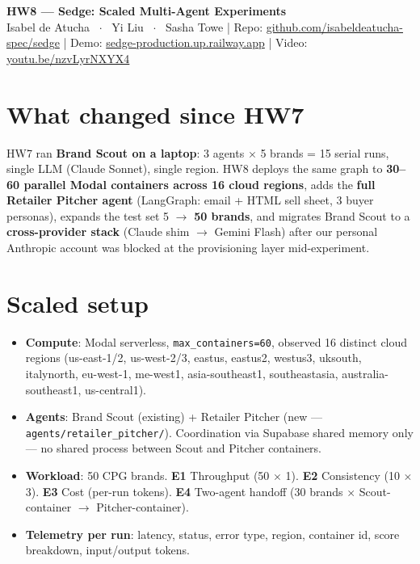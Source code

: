 \documentclass[9pt]{extarticle}
\begin{document}
\begin{center}
{\Large\bfseries HW8 — Sedge: Scaled Multi-Agent Experiments}\\[2pt]
{\small Isabel de Atucha \, $\cdot$ \, Yi Liu \, $\cdot$ \, Sasha Towe \quad|\quad
Repo: \href{https://github.com/isabeldeatucha-spec/sedge}{github.com/isabeldeatucha-spec/sedge} \quad|\quad
Demo: \href{https://sedge-production.up.railway.app}{sedge-production.up.railway.app} \quad|\quad
Video: \href{https://youtu.be/nzvLyrNXYX4}{youtu.be/nzvLyrNXYX4}}
\end{center}

\section*{What changed since HW7}
HW7 ran \textbf{Brand Scout on a laptop}: 3 agents $\times$ 5 brands = 15 serial runs, single LLM (Claude Sonnet), single region. HW8 deploys the same graph to \textbf{30--60 parallel Modal containers across 16 cloud regions}, adds the \textbf{full Retailer Pitcher agent} (LangGraph: email + HTML sell sheet, 3 buyer personas), expands the test set 5 $\rightarrow$ \textbf{50 brands}, and migrates Brand Scout to a \textbf{cross-provider stack} (Claude shim $\rightarrow$ Gemini Flash) after our personal Anthropic account was blocked at the provisioning layer mid-experiment.

\section*{Scaled setup}
\begin{itemize}
  \item \textbf{Compute}: Modal serverless, \texttt{max\_containers=60}, observed 16 distinct cloud regions (us-east-1/2, us-west-2/3, eastus, eastus2, westus3, uksouth, italynorth, eu-west-1, me-west1, asia-southeast1, southeastasia, australia-southeast1, us-central1).
  \item \textbf{Agents}: Brand Scout (existing) + Retailer Pitcher (new --- \texttt{agents/retailer\_pitcher/}). Coordination via Supabase shared memory only --- no shared process between Scout and Pitcher containers.
  \item \textbf{Workload}: 50 CPG brands. \textbf{E1} Throughput (50 $\times$ 1). \textbf{E2} Consistency (10 $\times$ 3). \textbf{E3} Cost (per-run tokens). \textbf{E4} Two-agent handoff (30 brands $\times$ Scout-container $\to$ Pitcher-container).
  \item \textbf{Telemetry per run}: latency, status, error type, region, container id, score breakdown, input/output tokens.
\end{itemize}
\end{document}
